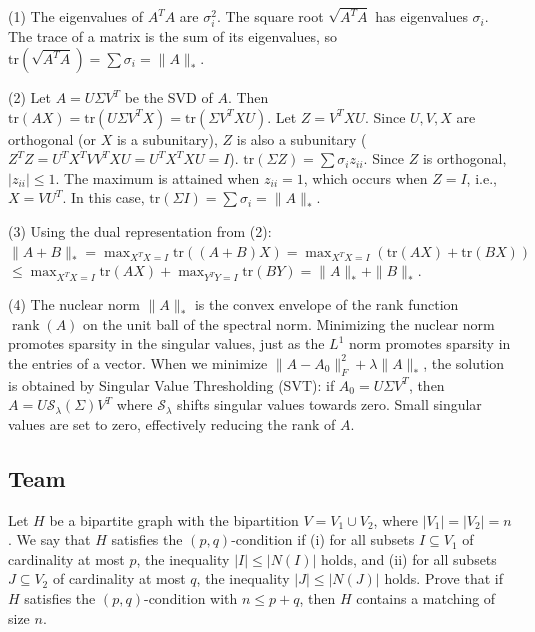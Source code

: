 \begin{solution}
(1) The eigenvalues of $A^T A$ are $\sigma_i^2$. The square root $\sqrt{A^T A}$ has eigenvalues $\sigma_i$. The trace of a matrix is the sum of its eigenvalues, so $\mathrm{tr}(\sqrt{A^T A}) = \sum \sigma_i = \|A\|_*$.

(2) Let $A = U \Sigma V^T$ be the SVD of $A$. Then $\mathrm{tr}(AX) = \mathrm{tr}(U \Sigma V^T X) = \mathrm{tr}(\Sigma V^T X U)$. Let $Z = V^T X U$. Since $U, V, X$ are orthogonal (or $X$ is a subunitary), $Z$ is also a subunitary ($Z^T Z = U^T X^T V V^T X U = U^T X^T X U = I$).
$\mathrm{tr}(\Sigma Z) = \sum \sigma_i z_{ii}$. Since $Z$ is orthogonal, $|z_{ii}| \leq 1$. The maximum is attained when $z_{ii} = 1$, which occurs when $Z = I$, i.e., $X = V U^T$. In this case, $\mathrm{tr}(\Sigma I) = \sum \sigma_i = \|A\|_*$.

(3) Using the dual representation from (2):
$\|A+B\|_* = \max_{X^T X = I} \mathrm{tr}((A+B)X) = \max_{X^T X = I} (\mathrm{tr}(AX) + \mathrm{tr}(BX))$
$\leq \max_{X^T X = I} \mathrm{tr}(AX) + \max_{Y^T Y = I} \mathrm{tr}(BY) = \|A\|_* + \|B\|_*$.

(4) The nuclear norm $\|A\|_*$ is the convex envelope of the rank function $\operatorname{rank}(A)$ on the unit ball of the spectral norm. Minimizing the nuclear norm promotes sparsity in the singular values, just as the $L^1$ norm promotes sparsity in the entries of a vector. When we minimize $\|A-A_0\|_F^2 + \lambda \|A\|_*$, the solution is obtained by Singular Value Thresholding (SVT): if $A_0 = U \Sigma V^T$, then $A = U \mathcal{S}_\lambda(\Sigma) V^T$ where $\mathcal{S}_\lambda$ shifts singular values towards zero. Small singular values are set to zero, effectively reducing the rank of $A$.
\end{solution}

\subsection{Team}

\begin{exercise}
\label{applied:2018:6}
Let $H$ be a bipartite graph with the bipartition $V = V_1 \cup V_2$, where $|V_1| = |V_2| = n$. We say that $H$ satisfies the $(p, q)$-condition if (i) for all subsets $I \subseteq V_1$ of cardinality at most $p$, the inequality $|I| \leq |N(I)|$ holds, and (ii) for all subsets $J \subseteq V_2$ of cardinality at most $q$, the inequality $|J| \leq |N(J)|$ holds.
Prove that if $H$ satisfies the $(p, q)$-condition with $n \leq p + q$, then $H$ contains a matching of size $n$.
\end{exercise}

